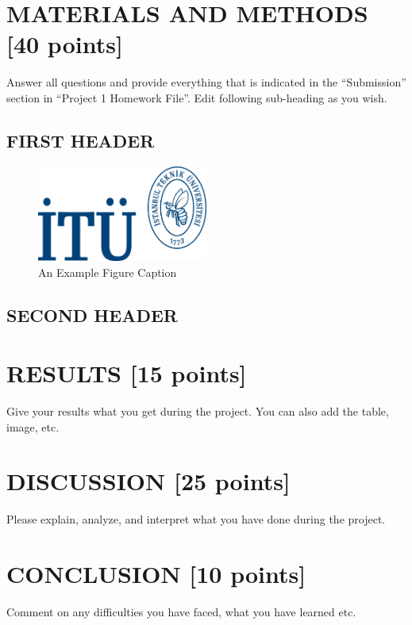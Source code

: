 \documentclass[pdftex,12pt,a4paper]{article}
\begin{document}
\section{MATERIALS AND METHODS [40 points]}
Answer all questions and provide everything that is indicated in the “Submission” section in “Project 1 Homework File”.
Edit following sub-heading as you wish.

\subsection{FIRST HEADER}
\begin{figure}[ht]
	\centering
	\includegraphics[width=0.5\textwidth]{logo.png}	
	\caption{An Example Figure Caption\cite{ref1}}
	\label{fig1}
\end{figure}

\subsection{SECOND HEADER}


\section{RESULTS [15 points]}
Give your results what you get during the project. You can also add the table, image, etc. 

\section{DISCUSSION [25 points]}
Please explain, analyze, and interpret what you have done during the project. 

\section{CONCLUSION [10 points]}
Comment on any difficulties you have faced, what you have learned etc.

\newpage
{}



\end{document}
